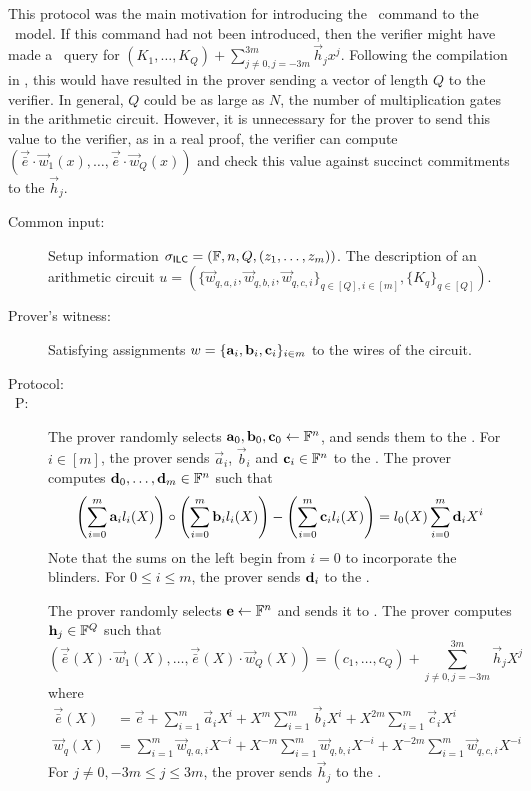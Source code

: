 This protocol was the main motivation for introducing the \ILCcheck\ command to the \ILC\ model. If this command had not been introduced, then the verifier might have made a \ILCopen\ query for $(K_1,\ldots,K_Q) + \sum_{j\neq 0, j=-3m}^{3m} \vec{h}_j {x^j}$. Following the compilation in \cite{BootleCGGHJ17}, this would have resulted in the prover sending a vector of length $Q$ to the verifier. In general, $Q$ could be as large as $N$, the number of multiplication gates in the arithmetic circuit. However, it is unnecessary for the prover to send this value to the verifier, as in a real proof, the verifier can compute $( \vec{\bar{e}}\cdot \vec{w}_1(x),\ldots, \vec{\bar{e}}\cdot \vec{w}_Q(x) )$ and check this value against succinct commitments to the $\vec{h}_j$.

\begin{description}
\item[Common input:] Setup information $\mathsf{\sigma}_{\mathsf{ILC}} = (\mathbb{F},n,Q,(z_1,\ldots,z_m))$. The description of an arithmetic circuit $u = \left( \{\vec{w}_{q,{a,i}},\vec{w}_{q,{b,i}},\vec{w}_{q,{c,i}}\}_{q \in [Q], i \in [m]}, \{K_{q}\}_{q \in [Q]}\right)$.
\item[Prover's witness:] Satisfying assignments $w = \{\mathbf{a}_i,\mathbf{b}_i,\mathbf{c}_i\}_{i \in m}$ to the wires of the circuit.
\item[Protocol:]
\item[\ P:]

The prover randomly selects $\mathbf{a}_{0},\mathbf{b}_{0},\mathbf{c}_{0}\gets \mathbb{F}^n$, and sends them to the \ILC. For $i \in [m]$, the prover sends $\vec{a}_{i}$, $\vec{b}_{i}$ and $\mathbf{c}_{i} \in \mathbb{F}^n$ to the \ILC. The prover computes $\mathbf{d}_0,\ldots,\mathbf{d}_m \in \mathbb{F}^n$ such that
\[
\left( \sum_{i=0}^m \mathbf{a}_{i} l_i(X) \right) \circ \left( \sum_{i=0}^m \mathbf{b}_{i} l_i(X) \right) - \left( \sum_{i=0}^m \mathbf{c}_{i} l_i(X) \right) = l_0(X) \sum_{i=0}^m \mathbf{d}_i X^i
\]
Note that the sums on the left begin from $i=0$ to incorporate the blinders. For $0 \leq i \leq m$, the prover sends $\mathbf{d}_i$ to the \ILC.

The prover randomly selects $\mathbf{e} \gets \mathbb{F}^n$ and sends it to \ILC. The prover computes $\mathbf{h}_j \in \mathbb{F}^Q$ such that
\[
(\vec{\bar{e}}(X)\cdot \vec{w}_1(X),\ldots,\vec{\bar{e}}(X)\cdot \vec{w}_Q(X)) = (c_1,\ldots,c_Q) + \sum_{j\neq 0,j=-3m}^{3m} \vec{h}_{j} X^j
\]
where
\begin{align*}
\vec{\bar{e}}(X) &= \vec{e} + \sum_{i=1}^m \vec{a}_{i} X^i + X^m \sum_{i=1}^m \vec{b}_{i} X^i + X^{2m} \sum_{i=1}^m \vec{c}_{i} X^i \\
\vec{w}_q(X) &= \sum_{i=1}^m \vec{w}_{q,a,i} X^{-i} + X^{-m} \sum_{i=1}^m \vec{w}_{q,b,i} X^{-i} + X^{-2m} \sum_{i=1}^m \vec{w}_{q,c,i} X^{-i}
\end{align*}
For $j\neq 0,-3m \leq j \leq 3m$, the prover sends $\vec{h}_j$ to the \ILC.


\end{description}
